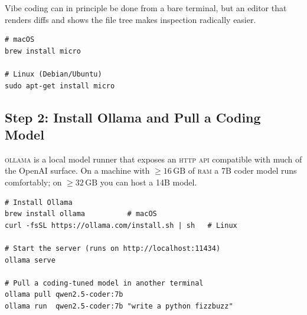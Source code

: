 \documentclass{../sharedAssets/tufte}
\begin{document}
Vibe coding can in principle be done from a bare terminal, but an editor
that renders diffs and shows the file tree makes inspection radically
easier.

\begin{fullwidth}
\begin{verbatim}
# macOS
brew install micro

# Linux (Debian/Ubuntu)
sudo apt-get install micro
\end{verbatim}
\end{fullwidth}


\subsection*{Step 2: Install Ollama and Pull a Coding Model}

\textsc{ollama}\cite{ollama2024} is a local model runner that exposes an
\textsc{http} \textsc{api} compatible with much of the OpenAI surface.
On a machine with \(\geq 16\,\text{GB}\) of \textsc{ram} a 7B coder model
runs comfortably; on \(\geq 32\,\text{GB}\) you can host a 14B model.

\begin{fullwidth}
\begin{verbatim}
# Install Ollama
brew install ollama          # macOS
curl -fsSL https://ollama.com/install.sh | sh   # Linux

# Start the server (runs on http://localhost:11434)
ollama serve

# Pull a coding-tuned model in another terminal
ollama pull qwen2.5-coder:7b
ollama run  qwen2.5-coder:7b "write a python fizzbuzz"
\end{verbatim}
\end{fullwidth}

\end{document}
